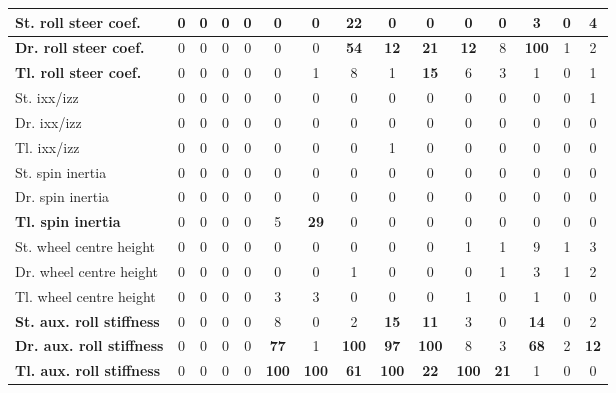 \begin{table}[H]
\begin{tabular}{|l|c|c|c|c|c|c|c|c|c|c|c|c|c|c|}
    \hline
    \textbf{St. roll steer coef.} & 0 & 0 & 0 & 0 & 0 & 0 & \textbf{22} & 0 & 0 & 0 & 0 & 3 & 0 & 4 \\
    \hline
    \textcolor[rgb]{0.851, 0.373, 0.008}{\textbf{Dr. roll steer coef.}} & 0 & 0 & 0 & 0 & 0 & 0 & \textcolor[rgb]{0.000, 0.447, 0.698}{\textbf{54}} & \textbf{12} & \textbf{21} & \textbf{12} & 8 & \textcolor[rgb]{0.835, 0.369, 0.000}{\textbf{100}} & 1 & 2 \\
    \hline
    \textbf{Tl. roll steer coef.} & 0 & 0 & 0 & 0 & 0 & 1 & 8 & 1 & \textbf{15} & 6 & 3 & 1 & 0 & 1 \\
    \hline
    St. \gls{ixx}/\gls{izz} & 0 & 0 & 0 & 0 & 0 & 0 & 0 & 0 & 0 & 0 & 0 & 0 & 0 & 1 \\
    \hline
    Dr. \gls{ixx}/\gls{izz} & 0 & 0 & 0 & 0 & 0 & 0 & 0 & 0 & 0 & 0 & 0 & 0 & 0 & 0 \\
    \hline
    Tl. \gls{ixx}/\gls{izz} & 0 & 0 & 0 & 0 & 0 & 0 & 0 & 1 & 0 & 0 & 0 & 0 & 0 & 0 \\
    \hline
    St. spin inertia & 0 & 0 & 0 & 0 & 0 & 0 & 0 & 0 & 0 & 0 & 0 & 0 & 0 & 0 \\
    \hline
    Dr. spin inertia & 0 & 0 & 0 & 0 & 0 & 0 & 0 & 0 & 0 & 0 & 0 & 0 & 0 & 0 \\
    \hline
    \textcolor[rgb]{0.000, 0.620, 0.451}{\textbf{Tl. spin inertia}} & 0 & 0 & 0 & 0 & 5 & \textcolor[rgb]{0.000, 0.620, 0.451}{\textbf{29}} & 0 & 0 & 0 & 0 & 0 & 0 & 0 & 0 \\
    \hline
    St. wheel centre height & 0 & 0 & 0 & 0 & 0 & 0 & 0 & 0 & 0 & 1 & 1 & 9 & 1 & 3 \\
    \hline
    Dr. wheel centre height & 0 & 0 & 0 & 0 & 0 & 0 & 1 & 0 & 0 & 0 & 1 & 3 & 1 & 2 \\
    \hline
    Tl. wheel centre height & 0 & 0 & 0 & 0 & 3 & 3 & 0 & 0 & 0 & 1 & 0 & 1 & 0 & 0 \\
    \hline
    \textbf{St. aux. roll stiffness} & 0 & 0 & 0 & 0 & 8 & 0 & 2 & \textbf{15} & \textbf{11} & 3 & 0 & \textbf{14} & 0 & 2 \\
    \hline
    \textcolor[rgb]{0.851, 0.373, 0.008}{\textbf{Dr. aux. roll stiffness}} & 0 & 0 & 0 & 0 & \textcolor[rgb]{0.000, 0.447, 0.698}{\textbf{77}} & 1 & \textcolor[rgb]{0.835, 0.369, 0.000}{\textbf{100}} & \textcolor[rgb]{0.000, 0.447, 0.698}{\textbf{97}} & \textcolor[rgb]{0.835, 0.369, 0.000}{\textbf{100}} & 8 & 3 & \textcolor[rgb]{0.000, 0.447, 0.698}{\textbf{68}} & 2 & \textbf{12} \\
    \hline
    \textcolor[rgb]{0.851, 0.373, 0.008}{\textbf{Tl. aux. roll stiffness}} & 0 & 0 & 0 & 0 & \textcolor[rgb]{0.835, 0.369, 0.000}{\textbf{100}} & \textcolor[rgb]{0.835, 0.369, 0.000}{\textbf{100}} & \textcolor[rgb]{0.000, 0.447, 0.698}{\textbf{61}} & \textcolor[rgb]{0.835, 0.369, 0.000}{\textbf{100}} & \textbf{22} & \textcolor[rgb]{0.835, 0.369, 0.000}{\textbf{100}} & \textbf{21} & 1 & 0 & 0 \\

\end{tabular}
\end{table}
